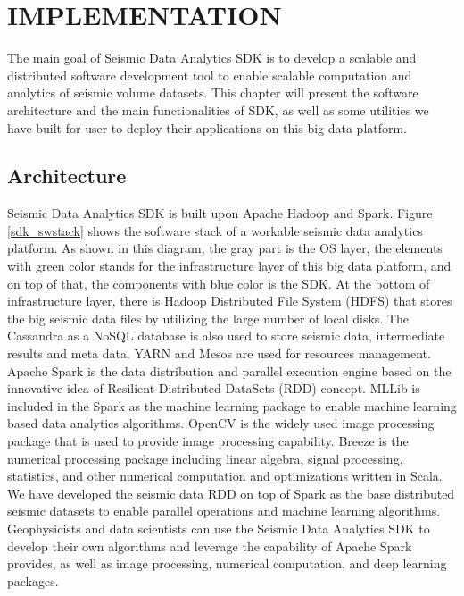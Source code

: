 %
%
%

\chapter{\uppercase{Implementation}}

The main goal of Seismic Data Analytics SDK is to develop a scalable and distributed software development tool to enable scalable computation and analytics of seismic volume datasets. This chapter will present the software architecture and the main functionalities of SDK, as well as some utilities we have built for user to deploy their applications on this big data platform.

\section{Architecture}

Seismic Data Analytics SDK is built upon Apache Hadoop and Spark. Figure \ref{sdk_swstack} shows the software stack of a workable seismic data analytics platform. As shown in this diagram, the gray part is the OS layer, the elements with green color stands for the infrastructure layer of this big data platform, and on top of that, the components with blue color is the SDK. At the bottom of infrastructure layer, there is Hadoop Distributed File System (HDFS) that stores the big seismic data files by utilizing the large number of local disks. The Cassandra as a NoSQL database is also used to store  seismic data, intermediate results and meta data. YARN and Mesos are used for resources management. Apache Spark is the data distribution and parallel execution engine based on the innovative idea of Resilient Distributed DataSets (RDD) concept. MLLib is included in the Spark as the machine learning package to enable machine learning based data analytics algorithms. OpenCV is the widely used image processing package that is used to provide image processing capability. Breeze is the numerical processing package including linear algebra, signal processing, statistics, and other numerical computation and optimizations written in Scala. We have developed the seismic data RDD on top of Spark as the base distributed seismic datasets to enable parallel operations and machine learning algorithms. Geophysicists and data scientists can use the Seismic Data Analytics SDK to develop their own algorithms and leverage the capability of Apache Spark provides, as well as image processing, numerical computation, and deep learning packages.

